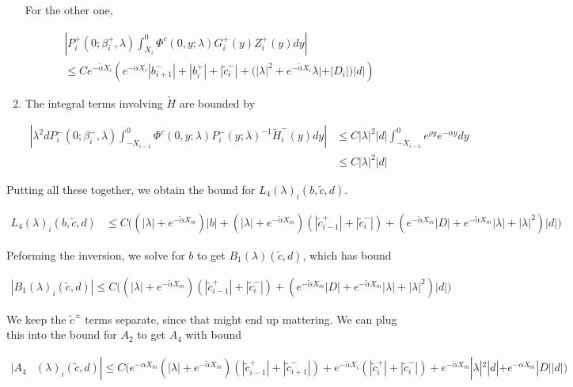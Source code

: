 \documentclass[12pt]{article}
\begin{document}
\begin{enumerate}
For the other one,

\begin{align*}
&\left| P_i^+(0; \beta_i^+, \lambda) \int_{X_i}^0 \Phi^c(0, y; \lambda) G_i^+(y) Z_i^+(y) dy \right| \\
&\leq C e^{-\tilde{\alpha} X_i} \left( e^{-\alpha X_i} |b_{i+1}^-| + |b_i^+| + |\tilde{c}_i^-| + (|\lambda|^2 + e^{-\tilde{\alpha} X_i} \lambda| + |D_i|) |d| \right)
\end{align*}

\item The integral terms involving $\tilde{H}$ are bounded by

\begin{align*}
\left| \lambda^2 d P_i^-(0; \beta_i^-, \lambda) \int_{-X_{i-1}}^0 \Phi^c(0, y; \lambda) P_i^-(y; \lambda)^{-1} \tilde{H}_i^-(y) dy \right| &\leq C |\lambda|^2 |d| \int_{-X_{i-1}}^0 e^{\rho y} e^{-\alpha y} dy \\
&\leq C |\lambda|^2 |d|
\end{align*}

\end{enumerate}

Putting all these together, we obtain the bound for $L_4(\lambda)_i(b, \tilde{c}, d)$.

\begin{align*}
L_4(\lambda)_i(b, \tilde{c}, d) &\leq 
C\Big( (|\lambda| + e^{-\tilde{\alpha}X_m})|b| 
+ (|\lambda| + e^{-\tilde{\alpha}X_m})( |\tilde{c}_{i-1}^+| + |\tilde{c}_i^-|)
+ ( e^{-\tilde{\alpha}X_m} |D| + e^{-\tilde{\alpha}X_m}|\lambda| + |\lambda|^2)|d| \Big)
\end{align*}

Peforming the inversion, we solve for $b$ to get $B_1(\lambda)(\tilde{c}, d)$, which has bound

\begin{align*}
|B_1(\lambda)_i(\tilde{c}, d)| \leq C\Big( 
(|\lambda| + e^{-\tilde{\alpha}X_m})( |\tilde{c}_{i-1}^+| + |\tilde{c}_i^-|)
+ ( e^{-\tilde{\alpha}X_m} |D| + e^{-\tilde{\alpha}X_m}|\lambda| + |\lambda|^2)|d| \Big)
\end{align*}

We keep the $\tilde{c}^\pm$ terms separate, since that might end up mattering. We can plug this into the bound for $A_2$ to get $A_4$ with bound

\begin{align*}
|A_4&(\lambda)_i(\tilde{c}, d)|
\leq C \Big( 
e^{-\alpha X_m} (|\lambda| + e^{-\tilde{\alpha}X_m})(|\tilde{c}_{i-1}^+| + |\tilde{c}_{i+1}^-|) + e^{-\tilde{\alpha}X_i}(|\tilde{c}_i^+| + |\tilde{c}_i^-|) + e^{-\tilde{\alpha} X_m} |\lambda|^2|d| + e^{-\alpha X_m}|D||d| \Big)
\end{align*} 
\end{document}
